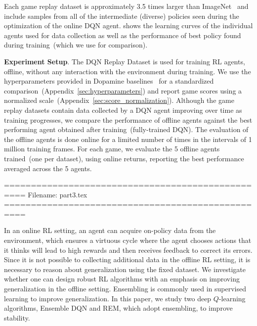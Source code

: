 Each game replay dataset is approximately 3.5 times larger than ImageNet~\citep{imagenet_cvpr09} and include samples from all of the intermediate (diverse) policies seen during the optimization of the online DQN agent.  shows the learning curves of the individual agents used for data collection as well as the performance of best policy found during training~(which we use for comparison).

{\bf Experiment Setup}. The DQN Replay Dataset is used for training
RL agents, offline, without any interaction with the
environment during training. We use the hyperparameters provided in Dopamine
baselines~\citep{castro2018dopamine} for a standardized
comparison~(Appendix~\ref{sec:hyperparameters}) and report game scores using
a normalized scale~(Appendix~\ref{sec:score_normalization}). Although the game replay datasets contain data collected by a DQN agent improving over time as training progresses, we compare the performance of offline agents against the best performing agent obtained after training~(\ie fully-trained DQN). 
The evaluation of the offline agents is done online for a limited number of times in the intervals of 1 million training frames. For each game, we evaluate the 5 offline agents trained~(one per dataset), using online returns, reporting the best performance averaged across the 5 agents. 



==================================================
Filename: part3.tex
==================================================

In an online RL setting, an agent can acquire on-policy data from the environment, which ensures a virtuous cycle where the agent chooses actions that it thinks will lead to
high rewards and then receives feedback to correct its errors. Since it is not possible to collecting additional data in the offline RL setting, it is necessary to reason
about generalization using the fixed dataset.
We investigate whether one can design robust RL algorithms with an emphasis on improving generalization in the offline setting.
Ensembling is commonly used in supervised learning to improve generalization.
In this paper, we study two deep $Q$-learning algorithms, Ensemble DQN and REM, which adopt ensembling, to improve stability.


